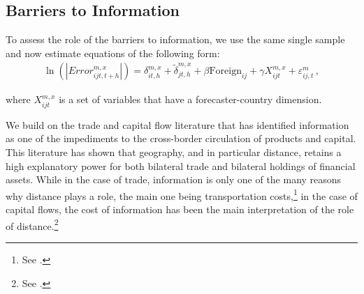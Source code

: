 
\subsection{Barriers to Information}


To assess the role of the barriers to information, we use the same single sample and now estimate equations of the following form:
\begin{align}
	\ln(|Error_{ijt,t+h}^{m,x}|)= \delta_{it,h}^{m,x} +\tilde\delta_{jt,h}^{m,x} +  \beta \text{Foreign}_{ij} +\gamma X_{ijt}^{m,x}+ \varepsilon_{ij,t}^m  \,, \label{eq:geography}
\end{align}

where $X_{ijt}^{m,x}$ is a set of variables that have a forecaster-country dimension.

We build on the trade and capital flow literature that has identified information as one of the impediments to the cross-border circulation of products and capital. This literature has shown that geography, and in particular distance, retains a high explanatory power for both bilateral trade and bilateral holdings of financial assets. While in the case of trade, information is only one of the many reasons why distance plays a role, the main one being transportation costs,\footnote{See \citet{AndersonvanWincoop2004,HeadMayer2013,Allen2014}.} in the case  of capital flows,  the cost of information has been the main interpretation of the role of distance.\footnote{See \citet{Ghosh2000,GrinblattKeloharju2001,DiGiovanni2005,PortesRey2005}.}

